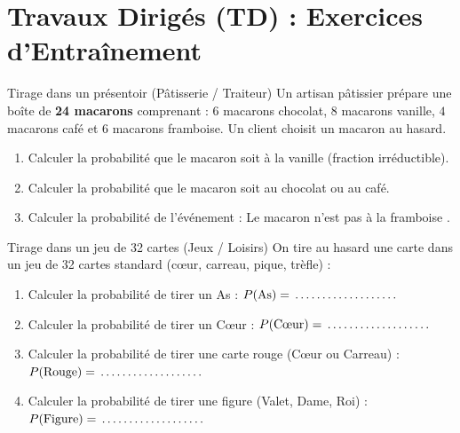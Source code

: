 \section{Travaux Dirigés (TD) : Exercices d'Entraînement}

\begin{exercice}[2 pts]{\capRealiser}{Tirage dans un présentoir (Pâtisserie / Traiteur)}
Un artisan pâtissier prépare une boîte de \textbf{24 macarons} comprenant :
$6$ macarons chocolat, $8$ macarons vanille, $4$ macarons café et $6$ macarons framboise.
Un client choisit un macaron au hasard.
\begin{enumerate}[leftmargin=1.5em]
    \item Calculer la probabilité que le macaron soit à la vanille (fraction irréductible).
    \item Calculer la probabilité que le macaron soit au chocolat ou au café.
    \item Calculer la probabilité de l'événement : \og Le macaron n'est pas à la framboise \fg{}.
\end{enumerate}
\lignesreponse[3]
\end{exercice}

\begin{exercice}[3 pts]{\capSApproprier}{Tirage dans un jeu de 32 cartes (Jeux / Loisirs)}
On tire au hasard une carte dans un jeu de 32 cartes standard (c\oe ur, carreau, pique, trèfle) :
\begin{enumerate}[leftmargin=1.5em]
    \item Calculer la probabilité de tirer un As : $P(\text{As}) = \pointille[3cm]$
    \item Calculer la probabilité de tirer un C\oe ur : $P(\text{C\oe ur}) = \pointille[3cm]$
    \item Calculer la probabilité de tirer une carte rouge (C\oe ur ou Carreau) : $P(\text{Rouge}) = \pointille[3cm]$
    \item Calculer la probabilité de tirer une figure (Valet, Dame, Roi) : $P(\text{Figure}) = \pointille[3cm]$
\end{enumerate}
\lignesreponse[2]
\end{exercice}

\newpage

